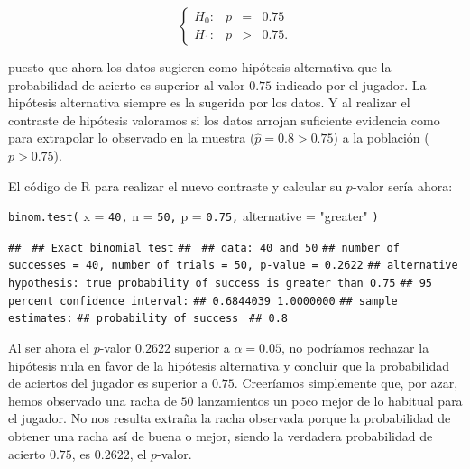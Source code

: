 \documentclass[
  notoc,
  nobib,
  degree=inf]{mnye}
\newenvironment{Shaded}{\begin{snugshade}}{\end{snugshade}}
\newcommand{\AttributeTok}[1]{\textcolor[rgb]{0.77,0.63,0.00}{#1}}
\newcommand{\DecValTok}[1]{\textcolor[rgb]{0.00,0.00,0.81}{#1}}
\newcommand{\FloatTok}[1]{\textcolor[rgb]{0.00,0.00,0.81}{#1}}
\newcommand{\FunctionTok}[1]{\textcolor[rgb]{0.00,0.00,0.00}{#1}}
\newcommand{\NormalTok}[1]{#1}
\newcommand{\StringTok}[1]{\textcolor[rgb]{0.31,0.60,0.02}{#1}}
\renewcommand{\DecValTok}[1]{\textcolor[RGB]{64, 160, 112}{\texttt{#1}}}
\renewcommand{\FloatTok}[1]{\textcolor[RGB]{64, 160, 112}{\texttt{#1}}}
\renewcommand{\FunctionTok}[1]{\textcolor[rgb]{0.13,0.29,0.53}{\texttt{#1}}}
\renewcommand{\NormalTok}[1]{\texttt{#1}}
\begin{document}
\[
  \left\{
  \begin{array}{lrcl}
    H_0:&p&=&0.75\\
    H_1:&p&>&0.75.
  \end{array}
  \right.
\]

puesto que ahora los datos sugieren como hipótesis alternativa que la probabilidad de acierto es superior al valor \(0.75\) indicado por el jugador. La hipótesis alternativa siempre es la sugerida por los datos. Y al realizar el contraste de hipótesis valoramos si los datos arrojan suficiente evidencia como para extrapolar lo observado en la muestra (\(\hat p = 0.8>0.75\)) a la población (\(p>0.75\)).

El código de \textsf{R} para realizar el nuevo contraste y calcular su \(p\)-valor sería ahora:

\begin{Shaded}
\begin{Highlighting}[]
\FunctionTok{binom.test}\NormalTok{(}
  \AttributeTok{x =} \DecValTok{40}\NormalTok{,}
  \AttributeTok{n =} \DecValTok{50}\NormalTok{,}
  \AttributeTok{p =} \FloatTok{0.75}\NormalTok{,}
  \AttributeTok{alternative =} \StringTok{"greater"}
\NormalTok{)}
\end{Highlighting}
\end{Shaded}

\begin{Shaded}
\begin{Highlighting}[]
\NormalTok{\#\# }
\NormalTok{\#\#  Exact binomial test}
\NormalTok{\#\# }
\NormalTok{\#\# data:  40 and 50}
\NormalTok{\#\# number of successes = 40, number of trials = 50, p{-}value = 0.2622}
\NormalTok{\#\# alternative hypothesis: true probability of success is greater than 0.75}
\NormalTok{\#\# 95 percent confidence interval:}
\NormalTok{\#\#  0.6844039 1.0000000}
\NormalTok{\#\# sample estimates:}
\NormalTok{\#\# probability of success }
\NormalTok{\#\#                    0.8}
\end{Highlighting}
\end{Shaded}

Al ser ahora el \(p\)-valor \(0.2622\) superior a \(\alpha=0.05\), no podríamos rechazar la hipótesis nula en favor de la hipótesis alternativa y concluir que la probabilidad de aciertos del jugador es superior a \(0.75\). Creeríamos simplemente que, por azar, hemos observado una racha de \(50\) lanzamientos un poco mejor de lo habitual para el jugador. No nos resulta extraña la racha observada porque la probabilidad de obtener una racha así de buena o mejor, siendo la verdadera probabilidad de acierto \(0.75\), es \(0.2622\), el \(p\)-valor.
\end{document}
